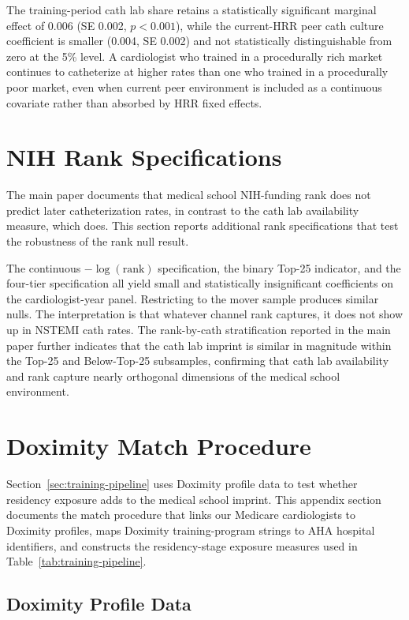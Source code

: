 \documentclass[12pt]{article}
\begin{document}
The training-period cath lab share retains a statistically significant marginal effect of 0.006 (SE 0.002, $p < 0.001$), while the current-HRR peer cath culture coefficient is smaller (0.004, SE 0.002) and not statistically distinguishable from zero at the 5\% level. A cardiologist who trained in a procedurally rich market continues to catheterize at higher rates than one who trained in a procedurally poor market, even when current peer environment is included as a continuous covariate rather than absorbed by HRR fixed effects.

\section{NIH Rank Specifications}\label{sec:app-rank}

The main paper documents that medical school NIH-funding rank does not predict later catheterization rates, in contrast to the cath lab availability measure, which does. This section reports additional rank specifications that test the robustness of the rank null result.

The continuous $-\log(\text{rank})$ specification, the binary Top-25 indicator, and the four-tier specification all yield small and statistically insignificant coefficients on the cardiologist-year panel. Restricting to the mover sample produces similar nulls. The interpretation is that whatever channel rank captures, it does not show up in NSTEMI cath rates. The rank-by-cath stratification reported in the main paper further indicates that the cath lab imprint is similar in magnitude within the Top-25 and Below-Top-25 subsamples, confirming that cath lab availability and rank capture nearly orthogonal dimensions of the medical school environment.

\section{Doximity Match Procedure}\label{sec:app-doximity}

Section~\ref{sec:training-pipeline} uses Doximity profile data to test whether residency exposure adds to the medical school imprint. This appendix section documents the match procedure that links our Medicare cardiologists to Doximity profiles, maps Doximity training-program strings to AHA hospital identifiers, and constructs the residency-stage exposure measures used in Table~\ref{tab:training-pipeline}.

\subsection{Doximity Profile Data}
\end{document}
